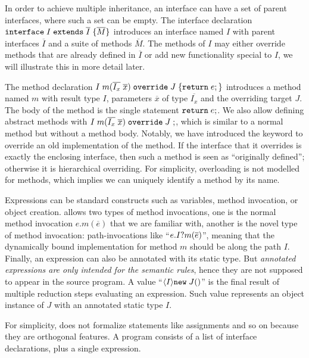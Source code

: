 In order to achieve multiple inheritance, an interface can have a set of 
parent interfaces, where such a set can be empty. The interface declaration $\texttt{interface} \; I \; \texttt{extends} \; \overline{I} \; {\{} \overline{M} {\}}$ introduces an interface named $I$ with parent interfaces $\overline{I}$ and a suite of methods $\overline{M}$. The methods of $I$ may either override methods that are already defined in $\overline{I}$ or add new functionality special to $I$, we will illustrate this in more detail later.

The method declaration $I \; m (\overline{I_x} \; \overline{x}) \; \texttt{override} \; J \; {\{} \texttt{return} \; e ; {\}}$ introduces a
method named $m$ with result type $I$, parameters $\overline{x}$ of
type $\overline{I_x}$ and the overriding target $J$. The body of the
method is the single statement $ \texttt{return} \; e;$. We also allow
defining abstract methods with $I \; m (\overline{I_x} \; \overline{x}) \; \texttt{override} \; J \; ;$, which is
similar to a normal method but without a method body. Notably, we have introduced the
\kwoverride{} keyword to override an old implementation of the
method. If the interface that it overrides is exactly the enclosing
interface, then such a method is seen as ``originally defined''; otherwise
it is hierarchical overriding.
For simplicity, overloading is not modelled for methods, which
implies we can uniquely identify a method by its name.

Expressions can be standard constructs such as variables, method
invocation, or object creation. \name{} allows two types of method invocations, one is the normal method invocation $e.m(\overline{e})$ that we are familiar with, another is the novel type of method invocation: path-invocations like ``$e.I? m(\overline{e})$'', meaning that the dynamically bound
implementation for method $m$ should be along the path $I$. 
Finally, an expression can also be annotated with its static type. But \emph{annotated expressions are only intended for the semantic rules},
hence they are not supposed to appear in the source program. A value
``$\langle I \rangle\texttt{new} \; J()$''
is the final result of multiple reduction steps evaluating an
expression. Such value represents an object instance
of $J$ with an annotated static type $I$.

For simplicity, \name{} does not formalize statements like assignments and so on because they are orthogonal features.
A program consists of a list of interface declarations, plus a single expression.

